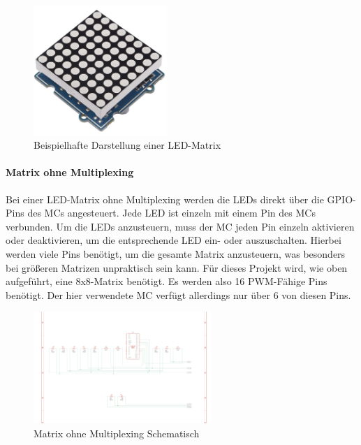 \begin{figure}[htbp] %
	\centering
	\includegraphics[width=0.45\textwidth]{img/LED-Matrix}
	\caption{Beispielhafte Darstellung einer LED-Matrix}
	\label{img:LED-Matrix}
\end{figure}

\paragraph{Matrix ohne Multiplexing}

Bei einer LED-Matrix ohne Multiplexing werden die LEDs direkt über die \ac{GPIO}-Pins des
\ac{MC}s angesteuert. Jede LED ist einzeln mit einem Pin des \ac{MC}s verbunden. Um die LEDs anzusteuern,
muss der \ac{MC} jeden Pin einzeln aktivieren oder deaktivieren, um die entsprechende LED ein- oder auszuschalten.
Hierbei werden viele Pins benötigt, um die gesamte Matrix anzusteuern, was besonders bei größeren Matrizen unpraktisch
sein kann. Für dieses Projekt wird, wie oben aufgeführt, eine 8x8-Matrix benötigt. Es werden also 16 PWM-Fähige Pins
benötigt. Der hier verwendete \ac{MC} verfügt allerdings nur über 6 von diesen Pins.

\begin{figure}[htbp] %
	\centering
	\includegraphics[width=0.6\textwidth]{img/LEDMatrixSchaltung}
	\caption{Matrix ohne Multiplexing Schematisch}
	\label{fig:Matrix}
\end{figure}

